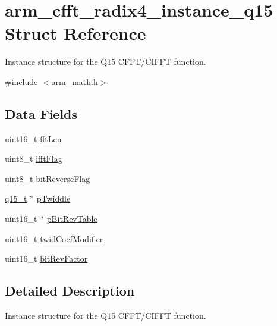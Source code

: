 \hypertarget{structarm__cfft__radix4__instance__q15}{}\section{arm\+\_\+cfft\+\_\+radix4\+\_\+instance\+\_\+q15 Struct Reference}
\label{structarm__cfft__radix4__instance__q15}


Instance structure for the Q15 C\+F\+F\+T/\+C\+I\+F\+FT function.  




{\ttfamily \#include $<$arm\+\_\+math.\+h$>$}

\subsection*{Data Fields}
\begin{DoxyCompactItemize}
\item 
uint16\+\_\+t \mbox{\hyperlink{structarm__cfft__radix4__instance__q15_ab8db3bbe7c61e6bb8ca2a55e3446e11a}{fft\+Len}}
\item 
uint8\+\_\+t \mbox{\hyperlink{structarm__cfft__radix4__instance__q15_ad6ca6e223f986ebfd94c5ee1e410aa73}{ifft\+Flag}}
\item 
uint8\+\_\+t \mbox{\hyperlink{structarm__cfft__radix4__instance__q15_a09a221a818c6d0e064557a99e2fe9a8b}{bit\+Reverse\+Flag}}
\item 
\mbox{\hyperlink{arm__math_8h_ab5a8fb21a5b3b983d5f54f31614052ea}{q15\+\_\+t}} $\ast$ \mbox{\hyperlink{structarm__cfft__radix4__instance__q15_aa8c837c05b2c910342ab8f171d30dc02}{p\+Twiddle}}
\item 
uint16\+\_\+t $\ast$ \mbox{\hyperlink{structarm__cfft__radix4__instance__q15_a46a2fb328199897af100fea0bfdf59aa}{p\+Bit\+Rev\+Table}}
\item 
uint16\+\_\+t \mbox{\hyperlink{structarm__cfft__radix4__instance__q15_afe772e5b5001c9d8e85032115a8df5bf}{twid\+Coef\+Modifier}}
\item 
uint16\+\_\+t \mbox{\hyperlink{structarm__cfft__radix4__instance__q15_a33386d95319dc3ee7097b3a8e52e01ec}{bit\+Rev\+Factor}}
\end{DoxyCompactItemize}


\subsection{Detailed Description}
Instance structure for the Q15 C\+F\+F\+T/\+C\+I\+F\+FT function. 

